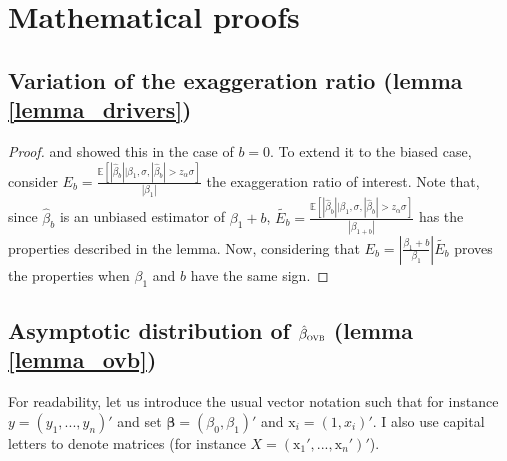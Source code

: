 \documentclass[usletter, 12pt]{article}
\begin{document}


		
	
\newpage
	



\newpage

\appendix

	\section{Mathematical proofs}\label{maths_proofs}
	

		\subsection{Variation of the exaggeration ratio (lemma \ref{lemma_drivers})}
			
			\begin{proof}
				\cite{lu_note_2019} and \cite{zwet_significance_2021} showed this in the case of $b = 0$. 
				To extend it to the biased case, consider 
				$E_{b} = \frac{\mathbb{E}\left[ |\hat{\beta}_{b}| \big| \beta_{1}, \sigma, |\hat{\beta}_{b}| > z_{\alpha} \sigma \right]}{|\beta_{1}|}$ the exaggeration ratio of interest. 
				Note that, since $\hat{\beta}_{b}$ is an unbiased estimator of $\beta_{1} + b$, $\tilde{E_{b}} = \frac{\mathbb{E}\left[ |\hat{\beta}_{b}| \big| \beta_{1}, \sigma, |\hat{\beta}_{b}| > z_{\alpha} \sigma \right]}{|\beta_{1 + b}|}$ has the properties described in the lemma. 
				Now, considering that $E_{b} = \left| \frac{\beta_{1} + b}{\beta_{1}} \right| \tilde{E_{b}}$ proves the properties when $\beta_{1}$ and $b$ have the same sign.
			\end{proof}
	

\subsection{Asymptotic distribution of $\hat{\beta}_{\textsc{ovb}}$ (lemma \ref{lemma_ovb})}
			
			For readability, let us introduce the usual vector notation such that for instance $y = (y_1, ..., y_n)'$ and set $\bm{\beta} = (\beta_0, \beta_1)'$ and $\text{x}_i = (1, x_i)'$. I also use capital letters to denote matrices (for instance $X = (\text{x}_{1}', ..., \text{x}_{n}')'$).\\
			
\end{document}
